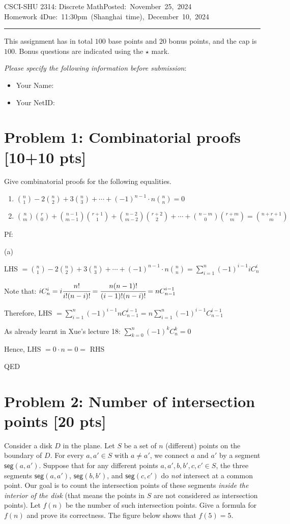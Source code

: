 \documentclass[11pt,twoside]{article}
\newcommand{\homework}[1]{
   \pagestyle{myheadings}
   \thispagestyle{plain}
   \newpage
   \setcounter{page}{1}
   \noindent
   \classname \hfill \mbox{\updatedday} \\
   \instname \hfill \mbox{\duedate}
   \rule{6.5in}{0.5mm}
   \vspace*{-0.1 in}
}
\newcommand{\problem}[1]{\section*{Problem #1}}
\def\classname{CSCI-SHU 2314: Discrete Math}
\def\updatedday{Posted: November 25, 2024}
\def\duedate{Due: 11:30pm (Shanghai time), December 10, 2024}
\def\instname{Homework 4}
\begin{document}
\homework{1}

This assignment has in total $100$ base points and $20$ bonus points, and the cap is $100$.
Bonus questions are indicated using the $\star$ mark.

\textit{Please specify the following information before submission}:
\begin{itemize}
    \item Your Name: %
    \item Your NetID: %
\end{itemize}



\problem{1: Combinatorial proofs [10+10 pts]} 

Give combinatorial proofs for the following equalities.

\begin{enumerate}

    \item $\binom{n}{1}-2\binom{n}{2}+3\binom{n}{3}+\cdots+(-1)^{n-1}\cdot n \binom{n}{n} = 0$
    \item $\binom{n}{m} \binom{r}{0} + \binom{n-1}{m-1} \binom{r+1}{1} + \binom{n-2}{m-2} \binom{r+2}{2} +\cdots+ \binom{n-m}{0} \binom{r+m}{m} = \binom{n+r+1}{m}$
    
\end{enumerate}

\hspace*{\fill}

Pf:

(a)

LHS $=\binom{n}{1}-2\binom{n}{2}+3\binom{n}{3}+\cdots+(-1)^{n-1}\cdot n \binom{n}{n} = \sum ^n_ {i=1} (-1)^{i-1}i C^i_n$

Note that: $iC^i_n = i\cfrac{n!}{i!(n-i)!} = \cfrac{n(n-1)!}{(i-1)!(n-i)!} = nC^{i-1}_{n-1}$

Therefore, LHS $= \sum ^n_ {i=1} (-1)^{i-1}nC^{i-1}_{n-1} = n\sum ^n_ {i=1} (-1)^{i-1}C^{i-1}_{n-1}$

As already learnt in Xue's lecture 18: $\sum ^n_ {k=0} (-1)^{k}C^{k}_{n} = 0$

Hence, LHS $=0\cdot n=0=$ RHS

QED




\problem{2: Number of intersection points [20 pts]}
Consider a disk $D$ in the plane.
Let $S$ be a set of $n$ (different) points on the boundary of $D$.
For every $a,a' \in S$ with $a \neq a'$, we connect $a$ and $a'$ by a segment $\mathsf{seg}(a,a')$.
Suppose that for any different points $a,a',b,b',c,c' \in S$, the three segments $\mathsf{seg}(a,a')$, $\mathsf{seg}(b,b')$, and $\mathsf{seg}(c,c')$ do \textit{not} intersect at a common point.
Our goal is to count the intersection points of these segments \textit{inside the interior of the disk} (that means the points in $S$ are not considered as intersection points).
Let $f(n)$ be the number of such intersection points.
Give a formula for $f(n)$ and prove its correctness.
The figure below shows that $f(5) = 5$.
\end{document}
